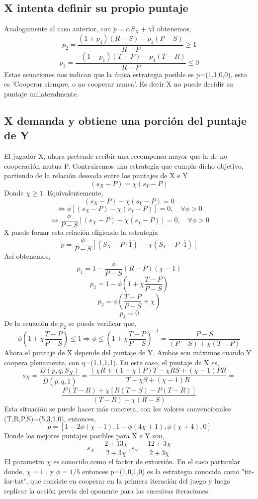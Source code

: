 \documentclass[11pt]{article}
\begin{document}
\subsection{X intenta definir su propio puntaje}
Analogamente al caso anterior, con $\tilde{p}=\alpha S_X + \gamma\overline1$  obtenemos,
$$p_2=\frac{(1+p_4)(R-S)-p_1(P-S)}{R-P}\geq 1$$
$$p_3=\frac{-(1-p_1)(T-P)-p_4(T-R)}{R-P}\leq 0$$
Estas ecuaciones nos indican que la única estrategia posible es p=(1,1,0,0), esto es 'Cooperar siempre, o no cooperar nunca'. Es decir
X no puede decidir su puntaje unilateralmente.


\subsection{X demanda y obtiene una porción del puntaje de Y}
El jugador X, ahora pretende recibir una recompensa mayor que la de no cooperación mutua P.
Contruiremos una estrategia que cumpla dicho objetivo, partiendo de la relación deseada entre los puntajes de X e Y
$$(s_X -P)=\chi (s_Y-P)$$
Donde $\chi \geq 1$. Equivalentemente,
$$(s_X -P)-\chi (s_Y-P)=0$$ $$\Leftrightarrow \phi[(s_X -P)-\chi (s_Y-P)]=0, \quad \forall \phi>0$$ $$\Leftrightarrow \frac{\phi}{P-S}[(s_X -P)-\chi (s_Y-P)]=0, \quad \forall \phi>0$$
X puede forzar esta relación eligiendo la estrategia
$$\tilde{p}=\frac{\phi}{P-S}[(S_X-P\cdot\overline1)\ - \chi (S_Y-P\cdot\overline1)]$$
Así obtenemos,
$$p_1=1-\frac{\phi}{P-S}(R-P)(\chi-1)$$
$$p_2=1-\phi(1+\chi \frac{T-P}{P-S})$$
$$p_3=\phi(\frac{T-P}{P-S}+\chi )$$
$$p_4=0$$
De la ecuación de $p_2$ se puede verificar que,
$$\phi(1+\chi\frac{T-P}{P-S})\leq 1 \Rightarrow \phi\leq(1+\chi \frac{T-P}{P-S})^{-1}=\frac{P-S}{(P-S) + \chi(T-P)}$$
Ahora el puntaje de X depende del puntaje de Y. Ambos son máximos cuando Y coopera plenamente, con
q=(1,1,1,1). En este caso, el puntaje de X es,
$$s_X= \frac{D(p,q,S_X)}{D(p,q,\overline1)}=\frac{(\chi R + (1-\chi)P)T-\chi RS+(\chi-1)PR}{T-\chi S+(\chi-1)R}=$$
$$\frac{P(T-R)+\chi[R(T-S)-P(T-R)]}{(T-R)+\chi(R-S)}$$
Esta situación se puede hacer más concreta, con los valores convencionales (T,R,P,S)=(5,3,1,0), entonces,
$$p=[1-2\phi(\chi-1),1-\phi(4 \chi+1),\phi(\chi+4),0]$$
Donde los mejores puntajes posibles para X e Y son,
$$s_X=\frac{2+13\chi}{2+3\chi}, s_Y=\frac{12+3\chi}{2+3\chi}$$
El parametro $\chi$ es conocido como el factor de extorsión. En el caso particular donde, $\chi=1$ , y $\phi =1/5$
entonces p=(1,0,1,0) es la estrategia conocida como "tit-for-tat", que consiste en cooperar en la primera 
iteración del juego y luego replicar la acción previa del oponente para las sucesivas iteraciones.
\end{document}
